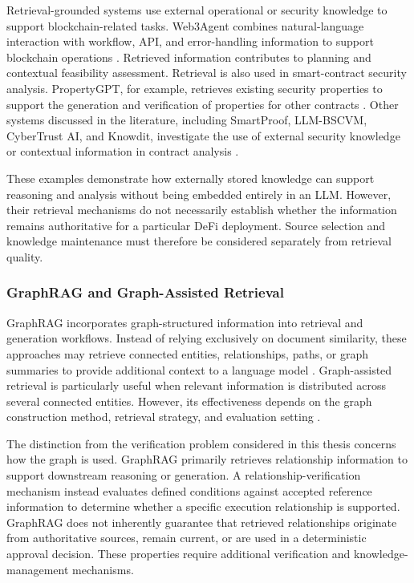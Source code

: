 Retrieval-grounded systems use external operational or
security knowledge to support blockchain-related tasks.
Web3Agent combines natural-language interaction with
workflow, API, and error-handling information to support
blockchain operations \cite{TODO_Web3Agent}. Retrieved
information contributes to planning and contextual
feasibility assessment. Retrieval is also used in smart-contract security analysis.
PropertyGPT, for example, retrieves existing security
properties to support the generation and verification
of properties for other contracts
\cite{TODO_PropertyGPT}. Other systems discussed in the
literature, including SmartProof, LLM-BSCVM, CyberTrust AI,
and Knowdit, investigate the use of external security
knowledge or contextual information in contract analysis
\cite{TODO_SmartProof,TODO_LLM_BSCVM,
TODO_CyberTrustAI,TODO_Knowdit}.

These examples demonstrate how externally stored knowledge
can support reasoning and analysis without being embedded
entirely in an LLM. However, their retrieval mechanisms do
not necessarily establish whether the information remains
authoritative for a particular DeFi deployment. Source
selection and knowledge maintenance must therefore be
considered separately from retrieval quality.

\subsubsection{GraphRAG and Graph-Assisted Retrieval}

GraphRAG incorporates graph-structured information into
retrieval and generation workflows. Instead of relying
exclusively on document similarity, these approaches may
retrieve connected entities, relationships, paths, or graph
summaries to provide additional context to a language model
\cite{hanRetrievalAugmentedGenerationGraphs2025}. Graph-assisted retrieval is particularly useful when
relevant information is distributed across several
connected entities. However, its effectiveness depends
on the graph construction method, retrieval strategy,
and evaluation setting
\cite{hanRAGGraphRAGSystematic2025,
hanRAGVsGraphRAG2026}.

The distinction from the verification problem considered
in this thesis concerns how the graph is used. GraphRAG
primarily retrieves relationship information to support
downstream reasoning or generation. A relationship-verification
mechanism instead evaluates defined conditions against
accepted reference information to determine whether a
specific execution relationship is supported. GraphRAG does not inherently guarantee that retrieved
relationships originate from authoritative sources, remain
current, or are used in a deterministic approval decision.
These properties require additional verification and
knowledge-management mechanisms.


